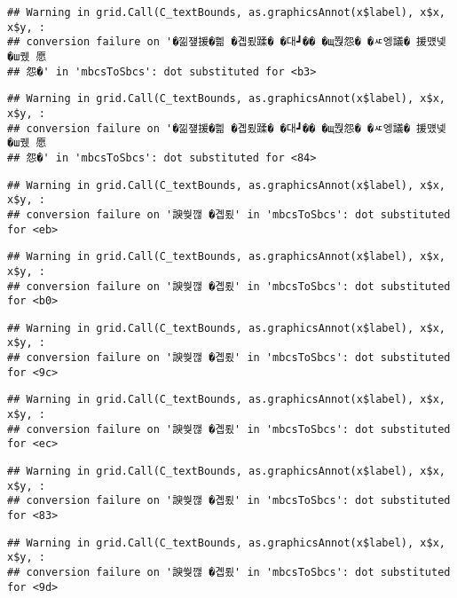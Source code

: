 \documentclass[
]{article}
\begin{document}
\begin{verbatim}
## Warning in grid.Call(C_textBounds, as.graphicsAnnot(x$label), x$x, x$y, :
## conversion failure on '�낆쟾援�쁾 �곕룄蹂� �대┛�� �щ쭩怨� �ㅼ엥議� 援먰넻�ш퀬 愿
## 怨�' in 'mbcsToSbcs': dot substituted for <b3>
\end{verbatim}

\begin{verbatim}
## Warning in grid.Call(C_textBounds, as.graphicsAnnot(x$label), x$x, x$y, :
## conversion failure on '�낆쟾援�쁾 �곕룄蹂� �대┛�� �щ쭩怨� �ㅼ엥議� 援먰넻�ш퀬 愿
## 怨�' in 'mbcsToSbcs': dot substituted for <84>
\end{verbatim}

\begin{verbatim}
## Warning in grid.Call(C_textBounds, as.graphicsAnnot(x$label), x$x, x$y, :
## conversion failure on '諛쒖깮 �곕룄' in 'mbcsToSbcs': dot substituted for <eb>
\end{verbatim}

\begin{verbatim}
## Warning in grid.Call(C_textBounds, as.graphicsAnnot(x$label), x$x, x$y, :
## conversion failure on '諛쒖깮 �곕룄' in 'mbcsToSbcs': dot substituted for <b0>
\end{verbatim}

\begin{verbatim}
## Warning in grid.Call(C_textBounds, as.graphicsAnnot(x$label), x$x, x$y, :
## conversion failure on '諛쒖깮 �곕룄' in 'mbcsToSbcs': dot substituted for <9c>
\end{verbatim}

\begin{verbatim}
## Warning in grid.Call(C_textBounds, as.graphicsAnnot(x$label), x$x, x$y, :
## conversion failure on '諛쒖깮 �곕룄' in 'mbcsToSbcs': dot substituted for <ec>
\end{verbatim}

\begin{verbatim}
## Warning in grid.Call(C_textBounds, as.graphicsAnnot(x$label), x$x, x$y, :
## conversion failure on '諛쒖깮 �곕룄' in 'mbcsToSbcs': dot substituted for <83>
\end{verbatim}

\begin{verbatim}
## Warning in grid.Call(C_textBounds, as.graphicsAnnot(x$label), x$x, x$y, :
## conversion failure on '諛쒖깮 �곕룄' in 'mbcsToSbcs': dot substituted for <9d>
\end{verbatim}
\end{document}
